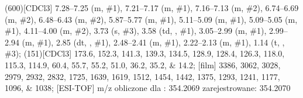\begin{fullexp}
  \NMR(600)[CDCl3] \numrange{7.28}{7.25} (m, \#{1}), \numrange{7.21}{7.17} (m, \#{1}), \numrange{7.16}{7.13} (m, \#{2}), \numrange{6.74}{6.69} (m, \#{2}), \numrange{6.48}{6.43} (m, \#{2}), \numrange{5.87}{5.77} (m, \#{1}), \numrange{5.11}{5.09} (m, \#{1}), \numrange{5.09}{5.05} (m, \#{1}), \numrange{4.11}{4.00} (m, \#{2}), \num{3.73} (s, \#{3}), \num{3.58} (td, , \#{1}), \numrange{3.05}{2.99} (m, \#{1}), \numrange{2.99}{2.94} (m, \#{1}), \num{2.85} (dt, , \#{1}), \numrange{2.48}{2.41} (m, \#{1}), \numrange{2.22}{2.13} (m, \#{1}), \num{1.14} (t, , \#{3}); 
  (151)[CDCl3] \numlist{173.6; 152.3; 141.3; 139.3; 134.5; 128.9; 128.4; 126.3; 118.0; 115.3; 114.9; 60.4; 55.7; 55.2; 51.0; 36.2; 35.2; 14.2}; 
  [film] \numlist{3386; 3062; 3028; 2979; 2932; 2832; 1725; 1639; 1619; 1512; 1454; 1442; 1375; 1293; 1241; 1177; 1096; 1038}; 
  [ESI-TOF] m/z obliczone dla : \num{354.2069} zarejestrowane: \num{354.2070}
\end{fullexp}
